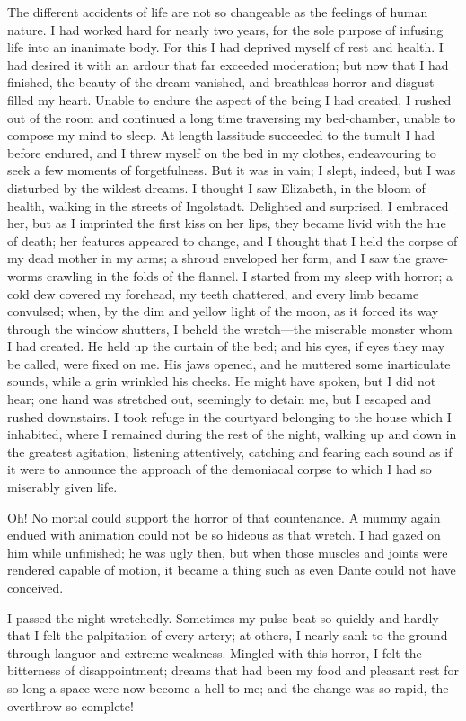 \documentclass[12pt,openright]{book}
\begin{document}
The different accidents of life are not so changeable as the feelings of human nature. I had worked hard for nearly two years, for the sole purpose of infusing life into an inanimate body. For this I had deprived myself of rest and health. I had desired it with an ardour that far exceeded moderation; but now that I had finished, the beauty of the dream vanished, and breathless horror and disgust filled my heart. Unable to endure the aspect of the being I had created, I rushed out of the room and continued a long time traversing my bed-chamber, unable to compose my mind to sleep. At length lassitude succeeded to the tumult I had before endured, and I threw myself on the bed in my clothes, endeavouring to seek a few moments of forgetfulness. But it was in vain; I slept, indeed, but I was disturbed by the wildest dreams. I thought I saw Elizabeth, in the bloom of health, walking in the streets of Ingolstadt. Delighted and surprised, I embraced her, but as I imprinted the first kiss on her lips, they became livid with the hue of death; her features appeared to change, and I thought that I held the corpse of my dead mother in my arms; a shroud enveloped her form, and I saw the grave-worms crawling in the folds of the flannel. I started from my sleep with horror; a cold dew covered my forehead, my teeth chattered, and every limb became convulsed; when, by the dim and yellow light of the moon, as it forced its way through the window shutters, I beheld the wretch—the miserable monster whom I had created. He held up the curtain of the bed; and his eyes, if eyes they may be called, were fixed on me. His jaws opened, and he muttered some inarticulate sounds, while a grin wrinkled his cheeks. He might have spoken, but I did not hear; one hand was stretched out, seemingly to detain me, but I escaped and rushed downstairs. I took refuge in the courtyard belonging to the house which I inhabited, where I remained during the rest of the night, walking up and down in the greatest agitation, listening attentively, catching and fearing each sound as if it were to announce the approach of the demoniacal corpse to which I had so miserably given life.

Oh! No mortal could support the horror of that countenance. A mummy again endued with animation could not be so hideous as that wretch. I had gazed on him while unfinished; he was ugly then, but when those muscles and joints were rendered capable of motion, it became a thing such as even Dante could not have conceived.

I passed the night wretchedly. Sometimes my pulse beat so quickly and hardly that I felt the palpitation of every artery; at others, I nearly sank to the ground through languor and extreme weakness. Mingled with this horror, I felt the bitterness of disappointment; dreams that had been my food and pleasant rest for so long a space were now become a hell to me; and the change was so rapid, the overthrow so complete!
\end{document}
